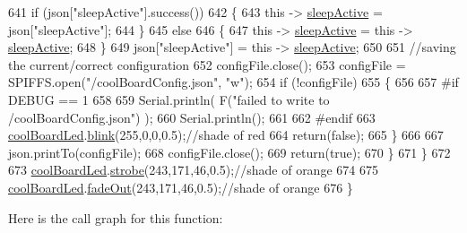 \begin{DoxyCode}
641             \textcolor{keywordflow}{if} (json[\textcolor{stringliteral}{"sleepActive"}].success())
642             \{
643                 \textcolor{keyword}{this} -> \hyperlink{classCoolBoard_a0a51b2287139f66c738101fb53139230}{sleepActive} = json[\textcolor{stringliteral}{"sleepActive"}];
644             \}
645             \textcolor{keywordflow}{else}
646             \{
647                 \textcolor{keyword}{this} -> \hyperlink{classCoolBoard_a0a51b2287139f66c738101fb53139230}{sleepActive} = \textcolor{keyword}{this} -> \hyperlink{classCoolBoard_a0a51b2287139f66c738101fb53139230}{sleepActive};
648             \}
649             json[\textcolor{stringliteral}{"sleepActive"}] = \textcolor{keyword}{this} -> \hyperlink{classCoolBoard_a0a51b2287139f66c738101fb53139230}{sleepActive};
650 
651             \textcolor{comment}{//saving the current/correct configuration}
652             configFile.close();
653             configFile = SPIFFS.open(\textcolor{stringliteral}{"/coolBoardConfig.json"}, \textcolor{stringliteral}{"w"});
654             \textcolor{keywordflow}{if} (!configFile)
655             \{
656             
657 \textcolor{preprocessor}{            #if DEBUG == 1}
658 
659                 Serial.println( F(\textcolor{stringliteral}{"failed to write to /coolBoardConfig.json"}) );
660                 Serial.println();
661             
662 \textcolor{preprocessor}{            #endif}
663                 \hyperlink{classCoolBoard_a1b1d3c684a5baa56b08486e192fd8e97}{coolBoardLed}.\hyperlink{classCoolBoardLed_a96e1ea13003eee34c9dbcef340404426}{blink}(255,0,0,0.5);\textcolor{comment}{//shade of red     }
664                 \textcolor{keywordflow}{return}(\textcolor{keyword}{false});
665             \}
666 
667             json.printTo(configFile);
668             configFile.close();
669             \textcolor{keywordflow}{return}(\textcolor{keyword}{true});
670         \}
671     \}
672 
673     \hyperlink{classCoolBoard_a1b1d3c684a5baa56b08486e192fd8e97}{coolBoardLed}.\hyperlink{classCoolBoardLed_ad5f0de4c628cbfbf49896042831c64ad}{strobe}(243,171,46,0.5);\textcolor{comment}{//shade of orange}
674     
675     \hyperlink{classCoolBoard_a1b1d3c684a5baa56b08486e192fd8e97}{coolBoardLed}.\hyperlink{classCoolBoardLed_a93d545679237e8cc858324367149775c}{fadeOut}(243,171,46,0.5);\textcolor{comment}{//shade of orange               }
676 \}
\end{DoxyCode}
Here is the call graph for this function\+:
\nopagebreak
